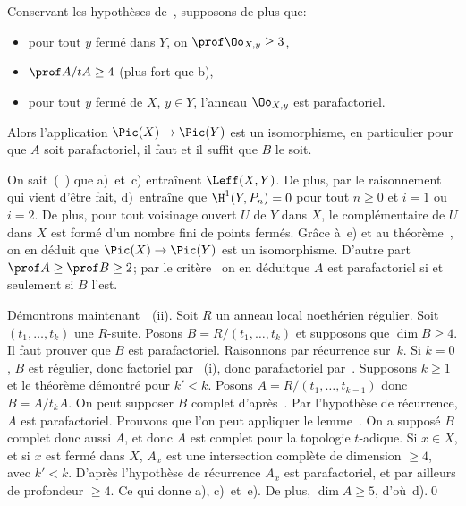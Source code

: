 \begin{lemme} \label{XI.3.17}
Conservant les hypoth\`eses de~, supposons de plus que:
\begin{itemize}
\item[c)] pour tout $y$ ferm\'e dans $Y$, on $\prof\Oo_{X, y}\geq 3$,
\item[d)] $\prof A/tA\geq 4$ (plus fort que b),
\item[e)] pour tout $y$ ferm\'e de $X$, $y\in Y$, l'anneau $\Oo_{X, y}$ est parafactoriel.
\end{itemize}
Alors l'application $\Pic(X)\to\Pic(Y)$ est un isomorphisme, en particulier pour que $A$ soit parafactoriel, il faut et il suffit que $B$ le soit.
\end{lemme}

\enlargethispage{5mm}%
On sait~(~) que a)~et~c) entra\^inent $\Leff(X, Y)$. De plus, par le raisonnement qui vient d'\^etre fait, d)~entra\^ine que $\H^1(Y, P_n)=0$ pour tout $n\geq 0$ et $i=1$ ou $i=2$. De plus, pour tout voisinage ouvert $U$ de $Y$ dans $X$, le compl\'ementaire de $U$ dans $X$ est form\'e d'un nombre fini de points ferm\'es. Gr\^ace \`a~e) et au th\'eor\`eme~, on en d\'eduit que $\Pic(X)\to \Pic(Y)$ est un isomorphisme. D'autre part $\prof A\geq \prof B\geq 2$; par le crit\`ere~ on en d\'eduit\pageoriginale que $A$ est parafactoriel si et seulement si $B$ l'est.

D\'emontrons maintenant~~(ii). Soit $R$ un anneau local noeth\'erien r\'egulier. Soit $(t_1, \ldots, t_k)$ une $R$-suite. Posons $B=R/(t_1, \ldots, t_k)$ et supposons que $\dim B\geq 4$. Il faut prouver que $B$ est parafactoriel. Raisonnons par r\'ecurrence sur~$k$. Si $k=0$, $B$ est r\'egulier, donc factoriel par ~(i), donc parafactoriel par~. Supposons $k\geq 1$ et le th\'eor\`eme d\'emontr\'e pour $k'<k$. Posons $A=R/(t_1, \ldots, t_{k-1})$ donc $B=A/t_k A$. On peut supposer $B$ complet d'apr\`es~. Par l'hypoth\`ese de r\'ecurrence, $A$ est parafactoriel. Prouvons que l'on peut appliquer le lemme~. On a suppos\'e $B$ complet donc aussi $A$, et donc $A$ est complet pour la topologie $t$-adique. Si $x\in X$, et si $x$ est ferm\'e dans $X$, $A_x$ est une intersection compl\`ete de dimension $\geq 4$, avec $k'<k$. D'apr\`es l'hypoth\`ese de r\'ecurrence $A_x$ est parafactoriel, et par ailleurs de profondeur $\geq 4$. Ce qui donne a), c)~et~e). De plus, $\dim A\geq 5$, d'o\`u~d).\qed


